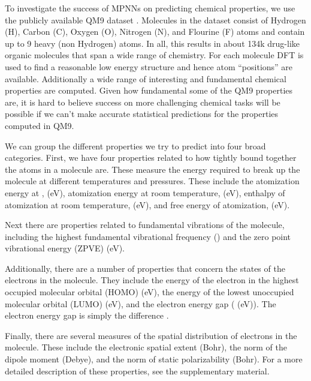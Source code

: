 \documentclass{article}
\begin{document}
To investigate the success of MPNNs on predicting chemical properties, we use the publicly available QM9 dataset \citep{ramakrishnan2014}. Molecules in the dataset consist of Hydrogen (H), Carbon (C), Oxygen (O), Nitrogen (N), and Flourine (F) atoms and contain up to 9 heavy (non Hydrogen) atoms. In all, this results in about 134k drug-like organic molecules that span a wide range of chemistry. For each molecule DFT is used to find a reasonable low energy  structure and hence atom ``positions'' are available. Additionally a wide range of interesting and fundamental chemical properties are computed. Given how fundamental some of the QM9 properties are, it is hard to believe success on more challenging chemical tasks will be possible if we can't make accurate statistical predictions for the properties computed in QM9.

We can group the different properties we try to predict into four broad categories. First, we have four properties related to how tightly bound together the atoms in a molecule are. These measure the energy required to break up the molecule at different temperatures and pressures. These include the atomization energy at ,  (eV), atomization energy at room temperature,  (eV), enthalpy of atomization at room temperature,  (eV), and free energy of atomization,  (eV).

Next there are properties related to fundamental vibrations of the molecule, including the highest fundamental vibrational frequency  () and the zero point vibrational energy (ZPVE) (eV). 

Additionally, there are a number of properties that concern the states of the electrons in the molecule. They include the energy of the electron in the highest occupied molecular orbital (HOMO)  (eV), the energy of the lowest unoccupied molecular orbital (LUMO)  (eV), and the electron energy gap ( (eV)). The electron energy gap is simply the difference .  

Finally, there are several measures of the spatial distribution of electrons in the molecule. These include the electronic spatial extent  (Bohr), the norm of the dipole moment  (Debye), and the norm of static polarizability  (Bohr). For a more detailed description of these properties, see the supplementary material.
\end{document}
